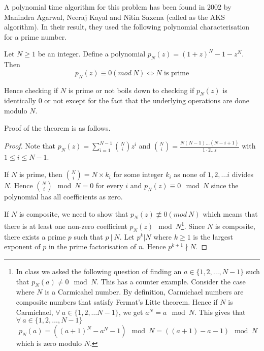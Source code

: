 A polynomial time algorithm for this problem has been found in 2002 by
Manindra Agarwal, Neeraj Kayal and Nitin Saxena (called as the AKS algorithm). 
In their result, they used the following polynomial characterisation for a
prime number.
\begin{theorem} Let $N \ge 1$ be
	an integer. Define a polynomial 
	$p_N(z) = (1+z)^N - 1 - z^N$. Then \[ p_N(z) \equiv 0 (mod~ N)
	\iff N \text{ is prime} \]
\end{theorem}

Hence checking if $N$ is prime or not boils down to checking if $p_N(z)$ is
identically $0$ or not except for the fact that the underlying operations are
done modulo $N$.

Proof of the theorem is as follows.
\begin{proof}
	Note that $p_N(z) = \sum_{i=1}^{N-1} \binom{N}{i} z^i$ and
	$\binom{N}{i} = \frac{N(N-1)\ldots (N-i+1)}{1\cdot 2 \ldots i}$ with $1
	\le i \le N-1$. 

	If $N$ is prime, then $\binom{N}{i} = N \times k_i$ for some integer
	$k_i$ as none of $1, 2, \ldots i$ divides $N$. Hence $\binom{N}{i}
	\mod N = 0$ for every $i$ and $p_N(z) \equiv 0 \mod N$ since the
	polynomial has all coefficients as zero.

	If $N$ is composite, we need to show that $p_N(z) \not 
	\equiv 0 (mod~ N)$ which means that there is at least one non-zero
	coefficient $p_N(z) \mod N$\footnote{In class we asked the following
		question of finding an $a \in \{1,2,\ldots, N-1\}$ such that
	$p_N(a) \ne 0 \mod N$. This has a counter example. Consider the case
	where $N$ is a Carmicahel number. By definition, Carmichael numbers
	are composite numbers that satisfy Fermat's Litte theorem.  Hence if
	$N$ is Carmichael,  $\forall~ a \in \{1,2,\ldots N-1 \}$, we get  $a^N
	= a \mod N$. This gives that $\forall~ a \in \{1,2,\ldots, N-1\}$
	\[	p_N(a)  = ((a+1)^N-a^N -1) \mod N = ((a+1)-a-1) \mod N \]
	which is zero modulo $N$.}. 	
	Since $N$ is composite, there exists a prime $p$ such that $p
	~|~ N$.  Let $p^k | N$ where $k \ge 1$ is the largest exponent of $p$
	in the prime factorisation of $n$. Hence $p^{k+1} \nmid N$.
	

\end{proof}
